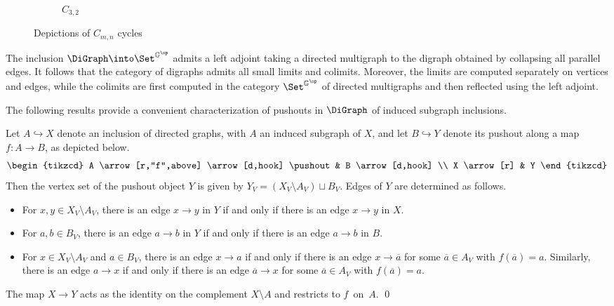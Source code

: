 \begin{defi}
\begin{figure}[H]
\begin{subfigure}[b]{0.3\textwidth}
            \caption{$C_{3,2}$}
            \label{fig:3-2cycle}
        \end{subfigure}    
        \caption{Depictions of $C_{m,n}$ cycles}
    \end{figure}   
\end{defi}
The inclusion $\DiGraph \into \Set^{\mathbb{G}^\op}$ admits a left adjoint taking a directed multigraph to the digraph obtained by collapsing all parallel edges.
It follows that the category of digraphs admits all small limits and colimits.
Moreover, the limits are computed separately on vertices and edges, while the colimits are first computed in the category $\Set^{\mathbb{G}^\op}$ of directed multigraphs and then reflected using the left adjoint.

The following results provide a convenient characterization of pushouts in $\DiGraph$ of induced subgraph inclusions.

\begin{lemma}\label{pushout-char}
Let $A \hookrightarrow X$ denote an inclusion of directed graphs, with $A$ an induced subgraph of $X$, and let $B \hookrightarrow Y$ denote its pushout along a map $f \colon A \to B$, as depicted below.
\[
\begin{tikzcd}
A \arrow[r,"f",above] \arrow[d,hook] \pushout & B \arrow[d,hook] \\
X \arrow[r] & Y
\end{tikzcd}
\]
Then the vertex set of the pushout object $Y$ is given by $Y_V = (X_V \setminus A_V) \sqcup B_V$. 
Edges of $Y$ are determined as follows.
\begin{itemize}
    \item For  $x, y \in X_V \setminus A_V$, there is an edge $x \to y$ in $Y$ if and only if there is an edge $x \to y$ in $X$.
    \item For $a, b \in B_V$, there is an edge $a \to b$ in $Y$ if and only if there is an edge $a \to b$ in $B$.
    \item For $x \in X_V \setminus A_V$ and $a \in B_V$, there is an edge $x \to a$ if and only if there is an edge $x \to \overline{a}$ for some $\overline{a} \in A_V$ with $f(\overline{a}) = a$. 
    Similarly, there is an edge $a \to x$ if and only if there is an edge $\overline{a} \to x$ for some $\overline{a} \in A_V$ with $f(\overline{a}) = a$.
\end{itemize}
The map $X \to Y$ acts as the identity on the complement $X \setminus A$ and restricts to $f$~on~$A$. \qed
\end{lemma}

